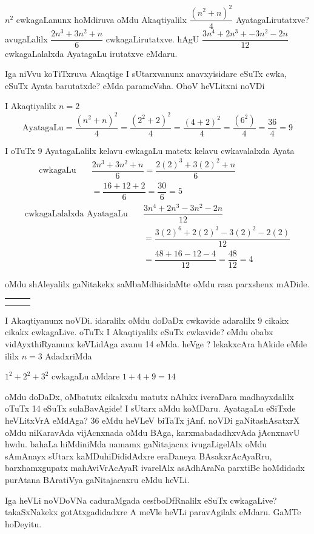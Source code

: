 $n^2$ cwkagaLanunx hoMdiruva oMdu Akaqtiyalilx $\dfrac{(n^2+n)^2}{4}$ Ayata\-gaLirutatxve?
avugaLalilx $\dfrac{2n^3+3n^2+n}{6}$ cwkagaLirutatxve. hAgU $\dfrac{3n^4+2n^3+-3n^2-2n}{12}$
cwkagaLalalxda AyatagaLu irutatxve eMdaru. 

Iga niVvu koTiTxruva Akaqtige I sUtarxvanunx anavxyisidare eSuTx cwka, eSuTx Ayata barutatxde? eMda parameVsha. OhoV heVLitxni noVDi

I Akaqtiyalilx $n=2$
$$
\text{AyatagaLu} =\dfrac{(n^2+n)^2}{4}=\dfrac{(2^2+2)^2}{4}=\dfrac{(4+2)^2}{4}=\dfrac{(6^2)}{4}=\dfrac{36}{4}=9
$$

I oTuTx {\rm 9} AyatagaLalilx kelavu cwkagaLu matetx kelavu cwkavalalxda Ayata
\begin{align*}
\text{cwkagaLu} \quad &\dfrac{2n^3+3n^2+n}{6}=\dfrac{2(2)^3+3(2)^2+n}{6} \hspace{2cm}\\
& =\dfrac{16+12+2}{6}=\dfrac{30}{6}=5
\end{align*}
\begin{align*}
\text{cwkagaLalalxda AyatagaLu}
 \quad &\dfrac{3n^4+2n^3-3n^2-2n}{12} \hspace{2cm}\\
&=\dfrac{3(2)^6+2(2)^3-3(2)^2-2(2)}{12}\\ 
 &=\dfrac{48+16-12-4}{12}=\dfrac{48}{12}=4
\end{align*}

oMdu shAleyalilx gaNitakekx saMbaMdhisidaMte oMdu rasa parxshenx mADide.
\begin{tabular}{|l|l|l|}
\hline
& & \\
\hline
& & \\
\hline
& & \\
\hline
\end{tabular}
I Akaqtiyanunx noVDi. idaralilx oMdu doDaDx cwkavide adaralilx {\rm 9} cikakx cikakx cwkagaLive. oTuTx I Akaqtiyalilx eSuTx cwkavide? eMdu obabx vidAyxthiRyanunx keVLidAga avanu {\rm 14} eMda. heVge ? lekakxcAra hAkide eMde ililx $n=3$ AdadxriMda

$1^2+2^2+3^2$ cwkagaLu aMdare $1+4+9=14$

oMdu doDaDx, oMbatutx cikakxdu matutx nAlukx iveraDara madhayxdalilx oTuTx {\rm 14} eSuTx sulaBavAgide! I sUtarx aMdu koMDaru. AyatagaLu eSiTxde heVLitxVrA eMdAga? {\rm 36} eMdu heVLeV biTaTx jAnf. noVDi gaNitashAsatxrX oMdu niKaravAda vijAcnxnada oMdu BAga, karxmabadadhxvAda jAcnxnavU hwdu. bahaLa hiMdiniMda namamx gaNitajacnx ivugaLigelAlx oMdu sAmAnayx sUtarx kaMDuhiDididAdxre eraDaneya BAsakxrAcAyaRru, barxhamxgupatx mahAviVrAcAyaR ivarelAlx asAdhAraNa parxtiBe hoMdidadx purAtana BAratiVya gaNitajacnxru eMdu heVLi.

Iga heVLi noVDoVNa caduraMgada cesfboDfRnalilx eSuTx cwkagaLive? takaSxNakekx gotAtxgadidadxre A meVle heVLi paravAgilalx eMdaru. GaMTe hoDeyitu.
